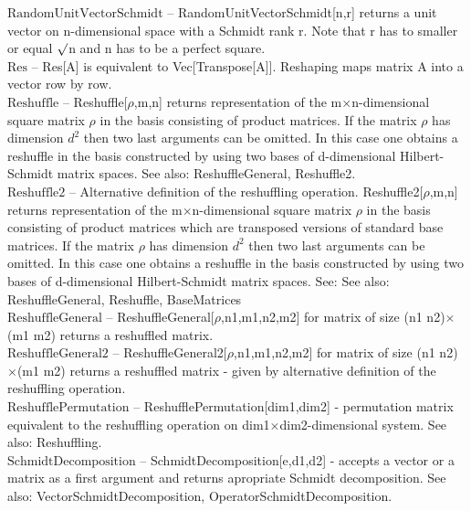 \documentclass[a4paper,10pt]{scrartcl}
\begin{document}
\textbf{$ \text{RandomUnitVectorSchmidt} $ }-- RandomUnitVectorSchmidt[n,r] returns a unit vector on n-dimensional space with a Schmidt rank r. Note that r has to smaller or equal $\surd $n and n has to be a perfect square.$  $\\

\textbf{$ \text{Res} $ }-- Res[A] is equivalent to Vec[Transpose[A]]. Reshaping maps matrix A into a vector row by row.$  $\\

\textbf{$ \text{Reshuffle} $ }-- Reshuffle[$\rho $,m,n] returns representation of the m$\times $n-dimensional square matrix $\rho $ in the basis consisting of product matrices. If  the matrix $\rho $ has dimension $ d^2 $ then two last arguments can be omitted. In this case one obtains a reshuffle in the basis constructed by using two bases of d-dimensional Hilbert-Schmidt matrix spaces. See also: ReshuffleGeneral, Reshuffle2.$  $\\

\textbf{$ \text{Reshuffle2} $ }-- Alternative definition of the reshuffling operation. Reshuffle2[$\rho $,m,n] returns representation of the m$\times $n-dimensional square matrix $\rho $ in the basis consisting of product matrices which are transposed versions of standard base matrices. If the matrix $\rho $ has dimension $ d^2 $ then two last arguments can be omitted. In this case one obtains a reshuffle in the basis constructed by using two bases of d-dimensional Hilbert-Schmidt matrix spaces. See: See also: ReshuffleGeneral, Reshuffle, BaseMatrices$  $\\

\textbf{$ \text{ReshuffleGeneral} $ }-- ReshuffleGeneral[$\rho $,n1,m1,n2,m2] for matrix of size (n1 n2)$\times $(m1 m2) returns a reshuffled matrix.$  $\\

\textbf{$ \text{ReshuffleGeneral2} $ }-- ReshuffleGeneral2[$\rho $,n1,m1,n2,m2] for matrix of size (n1 n2)$\times $(m1 m2) returns a reshuffled matrix - given by alternative definition of the reshuffling operation.$  $\\

\textbf{$ \text{ReshufflePermutation} $ }-- ReshufflePermutation[dim1,dim2] - permutation matrix equivalent to the reshuffling operation on dim1$\times $dim2-dimensional system. See also: Reshuffling.$  $\\

\textbf{$ \text{SchmidtDecomposition} $ }-- SchmidtDecomposition[e,d1,d2] - accepts a vector or a matrix as a first argument and returns apropriate Schmidt decomposition. See also: VectorSchmidtDecomposition, OperatorSchmidtDecomposition.$  $\\
\end{document}

